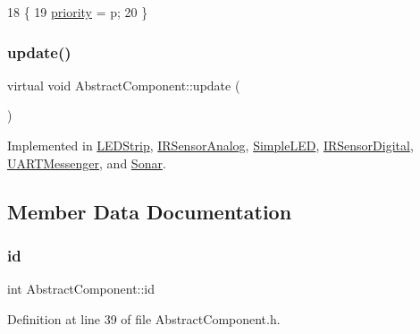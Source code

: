 \begin{DoxyCode}
18                             \{
19         \hyperlink{class_abstract_component_aff57dfa5f31be093a06b55560e33fb95}{priority} = p;
20     \}
\end{DoxyCode}
\mbox{\label{class_abstract_component_af25a90b8ab213762221c3b358d9873f3}} 
\subsubsection{\texorpdfstring{update()}{update()}}
{\footnotesize\ttfamily virtual void Abstract\+Component\+::update (\begin{DoxyParamCaption}{ }\end{DoxyParamCaption})\hspace{0.3cm}{\ttfamily [pure virtual]}}



Implemented in \hyperlink{class_l_e_d_strip_abc57d90870bb0e9c0d05e7ba6ca76c95}{L\+E\+D\+Strip}, \hyperlink{class_i_r_sensor_analog_a919942de7c5fc3af5da9a2b32e31d328}{I\+R\+Sensor\+Analog}, \hyperlink{class_simple_l_e_d_a1642dc4aca42ad46e5663a39cdda005f}{Simple\+L\+ED}, \hyperlink{class_i_r_sensor_digital_a8d09a546a1f4b4c6533c324d98a146a9}{I\+R\+Sensor\+Digital}, \hyperlink{class_u_a_r_t_messenger_a7f2c3bdcf3a2b082e52815b97be37281}{U\+A\+R\+T\+Messenger}, and \hyperlink{class_sonar_aaf10dd734528b86b4dea3ab35c4ee4f4}{Sonar}.



\subsection{Member Data Documentation}
\mbox{\label{class_abstract_component_a9c9c548149681b1a1dd935e66ed5dd11}} 
\subsubsection{\texorpdfstring{id}{id}}
{\footnotesize\ttfamily int Abstract\+Component\+::id\hspace{0.3cm}{\ttfamily [protected]}}



Definition at line 39 of file Abstract\+Component.\+h.

